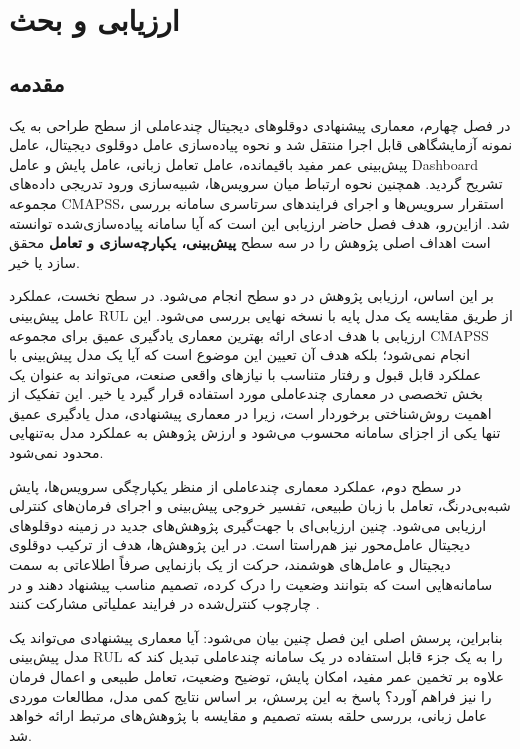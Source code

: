 \chapter{ارزیابی و بحث}
\label{chap:eval}

\section{مقدمه}
\label{sec:eval-introduction}

در فصل چهارم، معماری پیشنهادی دوقلوهای دیجیتال چندعاملی از سطح طراحی به یک نمونه آزمایشگاهی قابل اجرا منتقل شد و نحوه پیاده‌سازی عامل دوقلوی دیجیتال، عامل پیش‌بینی عمر مفید باقیمانده، عامل تعامل زبانی، عامل پایش و عامل \gls{Dashboard} تشریح گردید. همچنین نحوه ارتباط میان سرویس‌ها، شبیه‌سازی ورود تدریجی داده‌های مجموعه \gls{CMAPSS}، استقرار سرویس‌ها و اجرای فرایندهای سرتاسری سامانه بررسی شد. ازاین‌رو، هدف فصل حاضر ارزیابی این است که آیا سامانه پیاده‌سازی‌شده توانسته است اهداف اصلی پژوهش را در سه سطح \textbf{پیش‌بینی، یکپارچه‌سازی و تعامل} محقق سازد یا خیر.

بر این اساس، ارزیابی پژوهش در دو سطح انجام می‌شود. در سطح نخست، عملکرد عامل پیش‌بینی \gls{RUL} از طریق مقایسه یک مدل پایه با نسخه نهایی بررسی می‌شود. این ارزیابی با هدف ادعای ارائه بهترین معماری یادگیری عمیق برای مجموعه \gls{CMAPSS} انجام نمی‌شود؛ بلکه هدف آن تعیین این موضوع است که آیا یک مدل پیش‌بینی با عملکرد قابل قبول و رفتار متناسب با نیازهای واقعی صنعت، می‌تواند به عنوان یک بخش تخصصی در معماری چندعاملی مورد استفاده قرار گیرد یا خیر. این تفکیک از اهمیت روش‌شناختی برخوردار است، زیرا در معماری پیشنهادی، مدل یادگیری عمیق تنها یکی از اجزای سامانه محسوب می‌شود و ارزش پژوهش به عملکرد مدل به‌تنهایی محدود نمی‌شود.

در سطح دوم، عملکرد معماری چندعاملی از منظر یکپارچگی سرویس‌ها، پایش شبه‌بی‌درنگ، تعامل با زبان طبیعی، تفسیر خروجی پیش‌بینی و اجرای فرمان‌های کنترلی ارزیابی می‌شود. چنین ارزیابی‌ای با جهت‌گیری پژوهش‌های جدید در زمینه دوقلوهای دیجیتال عامل‌محور نیز هم‌راستا است. در این پژوهش‌ها، هدف از ترکیب دوقلوی دیجیتال و عامل‌های هوشمند، حرکت از یک بازنمایی صرفاً اطلاعاتی به سمت سامانه‌هایی است که بتوانند وضعیت را درک کرده، تصمیم مناسب پیشنهاد دهند و در چارچوب کنترل‌شده در فرایند عملیاتی مشارکت کنند \cite{lopez2024madtwin,puiu2025synergies,nicoletti2026humanagentic}.

بنابراین، پرسش اصلی این فصل چنین بیان می‌شود: آیا معماری پیشنهادی می‌تواند یک مدل پیش‌بینی \gls{RUL} را به یک جزء قابل استفاده در یک سامانه چندعاملی تبدیل کند که علاوه بر تخمین عمر مفید، امکان پایش، توضیح وضعیت، تعامل طبیعی و اعمال فرمان را نیز فراهم آورد؟ پاسخ به این پرسش، بر اساس نتایج کمی مدل، مطالعات موردی عامل زبانی، بررسی حلقه بسته تصمیم و مقایسه با پژوهش‌های مرتبط ارائه خواهد شد.

